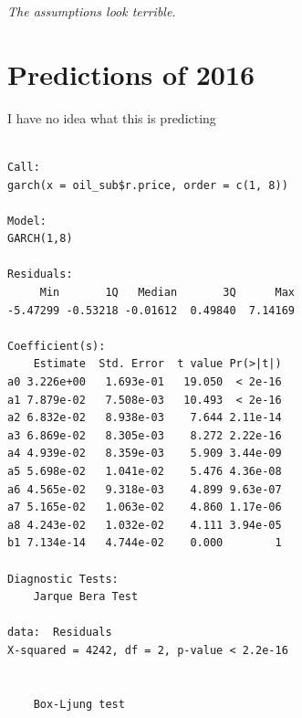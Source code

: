 \documentclass[11pt]{article}\usepackage[]{graphicx}\usepackage[]{color}
\makeatletter
\newenvironment{kframe}{%
 \def\at@end@of@kframe{}%
 \ifinner\ifhmode%
  \def\at@end@of@kframe{\end{minipage}}%
  \begin{minipage}{\columnwidth}%
 \fi\fi%
 \def\FrameCommand##1{\hskip\@totalleftmargin \hskip-\fboxsep
 \colorbox{shadecolor}{##1}\hskip-\fboxsep
     \hskip-\linewidth \hskip-\@totalleftmargin \hskip\columnwidth}%
 \MakeFramed {\advance\hsize-\width
   \@totalleftmargin\z@ \linewidth\hsize
   \@setminipage}}%
 {\par\unskip\endMakeFramed%
 \at@end@of@kframe}
\newenvironment{knitrout}{}{} %
\makeatother
\begin{document}
{\it The assumptions look terrible.}

\section*{Predictions of 2016}

I have no idea what this is predicting

\begin{knitrout}\footnotesize
{}\color{fgcolor}\begin{kframe}
\begin{verbatim}

Call:
garch(x = oil_sub$r.price, order = c(1, 8))

Model:
GARCH(1,8)

Residuals:
     Min       1Q   Median       3Q      Max 
-5.47299 -0.53218 -0.01612  0.49840  7.14169 

Coefficient(s):
    Estimate  Std. Error  t value Pr(>|t|)
a0 3.226e+00   1.693e-01   19.050  < 2e-16
a1 7.879e-02   7.508e-03   10.493  < 2e-16
a2 6.832e-02   8.938e-03    7.644 2.11e-14
a3 6.869e-02   8.305e-03    8.272 2.22e-16
a4 4.939e-02   8.359e-03    5.909 3.44e-09
a5 5.698e-02   1.041e-02    5.476 4.36e-08
a6 4.565e-02   9.318e-03    4.899 9.63e-07
a7 5.165e-02   1.063e-02    4.860 1.17e-06
a8 4.243e-02   1.032e-02    4.111 3.94e-05
b1 7.134e-14   4.744e-02    0.000        1

Diagnostic Tests:
	Jarque Bera Test

data:  Residuals
X-squared = 4242, df = 2, p-value < 2.2e-16


	Box-Ljung test


\end{verbatim}
\end{kframe}
\end{knitrout}
\end{document}
